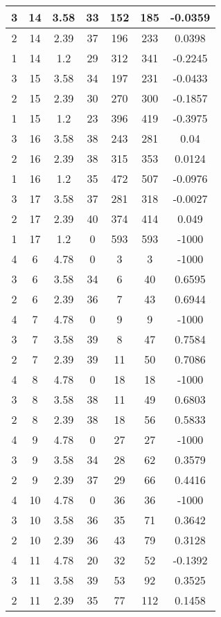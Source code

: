 \documentclass[letterpaper, 12pt]{article}
\begin{document}
\begin{longtable}{|c|c|c|c|c|c|c|}
\hline
3 & 14 & 3.58 & 33 & 152 & 185 & -0.0359 \\
\hline
2 & 14 & 2.39 & 37 & 196 & 233 & 0.0398 \\
\hline
1 & 14 & 1.2 & 29 & 312 & 341 & -0.2245 \\
\hline
3 & 15 & 3.58 & 34 & 197 & 231 & -0.0433 \\
\hline
2 & 15 & 2.39 & 30 & 270 & 300 & -0.1857 \\
\hline
1 & 15 & 1.2 & 23 & 396 & 419 & -0.3975 \\
\hline
3 & 16 & 3.58 & 38 & 243 & 281 & 0.04 \\
\hline
2 & 16 & 2.39 & 38 & 315 & 353 & 0.0124 \\
\hline
1 & 16 & 1.2 & 35 & 472 & 507 & -0.0976 \\
\hline
3 & 17 & 3.58 & 37 & 281 & 318 & -0.0027 \\
\hline
2 & 17 & 2.39 & 40 & 374 & 414 & 0.049 \\
\hline
1 & 17 & 1.2 & 0 & 593 & 593 & -1000 \\
\hline
4 & 6 & 4.78 & 0 & 3 & 3 & -1000 \\
\hline
3 & 6 & 3.58 & 34 & 6 & 40 & 0.6595 \\
\hline
2 & 6 & 2.39 & 36 & 7 & 43 & 0.6944 \\
\hline
4 & 7 & 4.78 & 0 & 9 & 9 & -1000 \\
\hline
3 & 7 & 3.58 & 39 & 8 & 47 & 0.7584 \\
\hline
2 & 7 & 2.39 & 39 & 11 & 50 & 0.7086 \\
\hline
4 & 8 & 4.78 & 0 & 18 & 18 & -1000 \\
\hline
3 & 8 & 3.58 & 38 & 11 & 49 & 0.6803 \\
\hline
2 & 8 & 2.39 & 38 & 18 & 56 & 0.5833 \\
\hline
4 & 9 & 4.78 & 0 & 27 & 27 & -1000 \\
\hline
3 & 9 & 3.58 & 34 & 28 & 62 & 0.3579 \\
\hline
2 & 9 & 2.39 & 37 & 29 & 66 & 0.4416 \\
\hline
4 & 10 & 4.78 & 0 & 36 & 36 & -1000 \\
\hline
3 & 10 & 3.58 & 36 & 35 & 71 & 0.3642 \\
\hline
2 & 10 & 2.39 & 36 & 43 & 79 & 0.3128 \\
\hline
4 & 11 & 4.78 & 20 & 32 & 52 & -0.1392 \\
\hline
3 & 11 & 3.58 & 39 & 53 & 92 & 0.3525 \\
\hline
2 & 11 & 2.39 & 35 & 77 & 112 & 0.1458 \\

\end{longtable}
\end{document}

